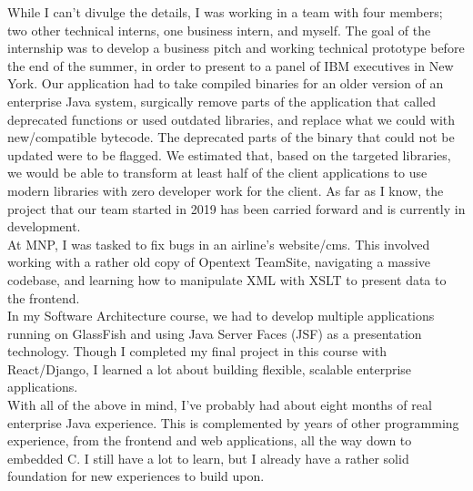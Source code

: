 \documentclass[]{rcf_cv}
\begin{document}
	While I can't divulge the details, I was working in a team with four members; two other technical 
	interns, one business intern, and myself. The goal of the internship was to develop a business pitch
	and working technical prototype before the end of the summer, in order to present to a panel of
	IBM executives in New York. Our application had to take compiled binaries for an older version of
	an enterprise Java system, surgically remove parts of the application that called deprecated functions
	or used outdated libraries, and replace what we could with new/compatible bytecode. The deprecated
	parts of the binary that could not be updated were to be flagged. We estimated that, based on the
	targeted libraries, we would be able to transform at least half of the client applications to
	use modern libraries with zero developer work for the client. As far as I know, the project that
	our team started in 2019 has been carried forward and is currently in development. \\
	
	At MNP, I was tasked to fix bugs in an airline's website/cms. This involved working with a rather
	old copy of Opentext TeamSite, navigating a massive codebase, and learning how to manipulate XML with
	XSLT to present data to the frontend. \\
	
	In my Software Architecture course, we had to develop multiple applications running on GlassFish and
	using Java Server Faces (JSF) as a presentation technology. Though I completed my final project in 
	this course with React/Django, I learned a lot about building flexible, scalable 
	enterprise applications. \\
	
	With all of the above in mind, I've probably had about eight months of real enterprise Java experience.
	This is complemented by years of other programming experience, from the frontend and web applications, 
	all the way down to embedded C. I still have a lot to learn, but I already have a rather solid 
	foundation for new experiences to build upon.
	
	
	
	
\end{document}
